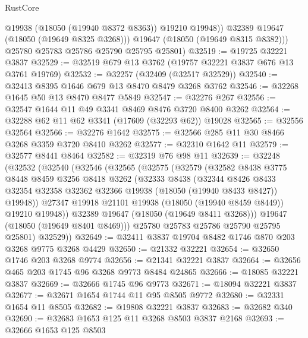 \begin{lexlean}{RustCore}
\begin{coremodule}
              @19938
              (@18050 (@19940 @8372 @8363))
              @19210
              @19948))
          @32389
          @19647
          (@18050 (@19649 @8325 @3268)))
        @19647
        (@18050 (@19649 @8315 @8382)))
      @25780
      @25783
      @25786
      @25790
      @25795
      @25801)
@32519 := @19725 @32221 @3837
@32529 := @32519 @679 @13 @3762 (@19757 @32221 @3837 @676 @13 @3761 @19769)
@32532 := @32257 (@32409 (@32517 @32529))
@32540 := @32413 @8395 @1646 @679 @13 @8470 @8479 @3268 @3762
@32546 := @32268 @1645 @50 @13 @8470 @8477 @5849
@32547 := @32276 @267
@32556 := @32547 @1644 @11 @49 @3341 @8469 @8476 @3720 @8400 @3262
@32564 := @32288 @62 @11 @62 @3341 (@17609 (@32293 @62)) @19028
@32565 := @32556 @32564
@32566 := @32276 @1642
@32575 := @32566 @285 @11 @30 @8466 @3268 @3359 @3720 @8410 @3262
@32577 := @32310 @1642 @11
@32579 := @32577 @8441 @8464
@32582 := @32319 @76 @98 @11
@32639 := @32248
    (@32532
      (@32540
        (@32546
          (@32565
            (@32575
              (@32579
                (@32582
                  @8438
                  @3775
                  @8448
                  @8459
                  @3256
                  @8418
                  @3262
                  (@32333
                    @8438
                    (@32344
                      @8426
                      @8433
                      @32354
                      @32358
                      @32362
                      @32366
                      @19938
                      (@18050 (@19940 @8433 @8427))
                      @19948))
                  @27347
                  @19918
                  @21101
                  @19938
                  (@18050 (@19940 @8459 @8449))
                  @19210
                  @19948))
              @32389
              @19647
              (@18050 (@19649 @8411 @3268)))
            @19647
            (@18050 (@19649 @8401 @8469)))
          @25780
          @25783
          @25786
          @25790
          @25795
          @25801)
        @32529))
@32649 := @32411 @3837 @19704 @8482 @1746 @870 @203 @3268 @9775 @3268 @4429
@32650 := @21332 @32221
@32654 := @32650 @1746 @203 @3268 @9774
@32656 := @21341 @32221 @3837
@32664 := @32656 @465 @203 @1745 @96 @3268 @9773 @8484 @24865
@32666 := @18085 @32221 @3837
@32669 := @32666 @1745 @96 @9773
@32671 := @18094 @32221 @3837
@32677 := @32671 @1654 @1744 @11 @95 @8505 @9772
@32680 := @32331 @1654 @11 @8505
@32682 := @19808 @32221 @3837
@32683 := @32682 @340
@32690 := @32683 @1653 @125 @11 @3268 @8503 @3837 @2168
@32693 := @32666 @1653 @125 @8503

\end{coremodule}
\end{lexlean}
